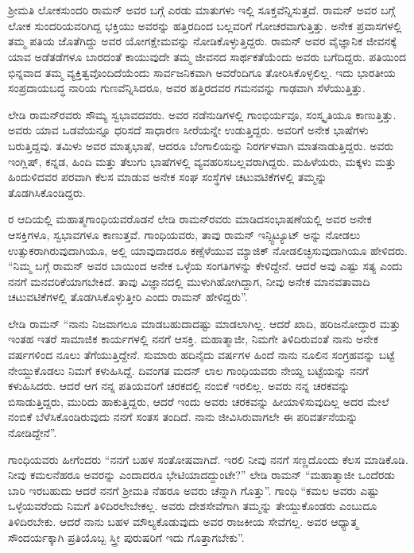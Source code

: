 
\chapter{}
	

ಶ‍್ರೀಮತಿ ಲೋಕಸುಂದರಿ ರಾಮನ್ ಅವರ ಬಗ್ಗೆ ಎರಡು ಮಾತುಗಳು ಇಲ್ಲಿ ಸೂಕ್ತವೆನ್ನಿಸುತ್ತದೆ. ರಾಮನ್ ಅವರ ಬಗ್ಗೆ ಲೋಕ ಸುಂದರಿಯವರಿಗಿದ್ದ ಭಕ್ತಿಯು ಅವರನ್ನು ಹತ್ತಿರದಿಂದ ಬಲ್ಲವರಿಗೆ ಗೋಚರವಾಗುತ್ತಿತ್ತು. ಅನೇಕ ಪ್ರವಾಸಗಳಲ್ಲಿ ತಮ್ಮ ಪತಿಯ ಜೊತೆಗಿದ್ದು ಅವರ ಯೋಗಕ್ಷೇಮವನ್ನು ನೋಡಿಕೊಳ್ಳುತ್ತಿದ್ದರು. ರಾಮನ್ ಅವರ ವೈಜ್ಞಾನಿಕ ಜೀವನಕ್ಕೆ ಯಾವ ಅಡೆತಡೆಗಳೂ ಬಾರದಂತೆ ಕಾಯುವುದೇ ತಮ್ಮ ಜೀವನದ ಸಾರ್ಥಕತೆಯೆಂದು ಅವರು ಬಗೆದಿದ್ದರು. ಪತಿಯಿಂದ ಭಿನ್ನವಾದ ತಮ್ಮ ವ್ಯಕ್ತಿತ್ವವೊಂದಿದೆಯೆಂದು ಸಾರ್ವಜನಿಕವಾಗಿ ಅವರೆಂದಿಗೂ ತೋರಿಸಿಕೊಳ್ಳಲಿಲ್ಲ. ಇದು ಭಾರತೀಯ ಸಂಪ್ರದಾಯಬದ್ಧ ನಾರಿಯ ಗುಣವೆನ್ನಿಸಿದರೂ, ಅವರ ಹತ್ತಿರದವರ ಗಮನವನ್ನು ಗಾಢವಾಗಿ ಸೆಳೆಯುತ್ತಿತ್ತು.

ಲೇಡಿ ರಾಮನ್‍ರವರು ಸೌಮ್ಯ ಸ್ವಭಾವದವರು. ಅವರ ನಡೆನುಡಿಗಳಲ್ಲಿ ಗಾಂಭಿರ್ಯವೂ, ಸಂಸ್ಕೃತಿಯೂ ಕಾಣುತ್ತಿತ್ತು. ಅವರು ಯಾವ ಒಡವೆಯನ್ನೂ ಧರಿಸದೆ ಸಾಧಾರಣ ಸೀರೆಯನ್ನೇ ಉಡುತ್ತಿದ್ದರು. ಅವರಿಗೆ ಅನೇಕ ಭಾಷೆಗಳು ಬರುತ್ತಿದ್ದವು. ತಮಿಳು ಅವರ ಮಾತೃಭಾಷೆ, ಆದರೂ ಬೆಂಗಾಲಿಯನ್ನು ನಿರರ್ಗಳವಾಗಿ ಮಾತನಾಡುತ್ತಿದ್ದರು. ಅವರು ಇಂಗ್ಲಿಷ್, ಕನ್ನಡ, ಹಿಂದಿ ಮತ್ತು ತೆಲುಗು ಭಾಷೆಗಳಲ್ಲಿ ವ್ಯವಹರಿಸಬಲ್ಲವರಾಗಿದ್ದರು. ಮಹಿಳೆಯರು, ಮಕ್ಕಳು ಮತ್ತು ಹಿಂದುಳಿದವರ ಪರವಾಗಿ ಕೆಲಸ ಮಾಡುವ ಅನೇಕ ಸಂಘ ಸಂಸ್ಥೆಗಳ ಚಟುವಟಿಕೆಗಳಲ್ಲಿ ತಮ್ಮನ್ನು ತೊಡಗಿಸಿಕೊಂಡಿದ್ದರು.

ರ ಆದಿಯಲ್ಲಿ ಮಹಾತ್ಮಗಾಂಧಿಯವರೊಡನೆ ಲೇಡಿ ರಾಮನ್‍ರವರು ಮಾಡಿದ\break ಸಂಭಾಷಣೆಯಲ್ಲಿ ಅವರ ಅನೇಕ ಆಸಕ್ತಿಗಳೂ, ಸ್ವಭಾವಗಳೂ ಕಾಣುತ್ತವೆ. ಗಾಂಧಿಯವರು, ತಾವು ರಾಮನ್ ಇನ್ಸ್ಟಿಟ್ಯೂಟ್ ಅನ್ನು ನೋಡಲು ಉತ್ಸುಕರಾಗಿರುವುದಾಗಿಯೂ, ಅಲ್ಲಿ ಯಾವುದಾದರೂ ಕಣ್ಸೆಳೆಯುವ ಮ್ಯಾಜಿಕ್ ನೋಡಲಿಚ್ಛಿಸುವುದಾಗಿಯೂ ಹೇಳಿದರು. “ನಿಮ್ಮ ಬಗ್ಗೆ ರಾಮನ್ ಅವರ ಬಾಯಿಂದ ಅನೇಕ ಒಳ್ಳೆಯ ಸಂಗತಿಗಳನ್ನು ಕೇಳಿದ್ದೇನೆ. ಆದರೆ ಅವು ಎಷ್ಟು ಸತ್ಯ ಎಂದು ನನಗೆ ಮನವರಿಕೆಯಾಗಬೇಕಿದೆ. ತಾವು ವಿಜ್ಞಾನದಲ್ಲಿ ಮುಳುಗಿಹೋಗಿದ್ದಾಗ, ನೀವು ಅನೇಕ ಮಾನವತಾವಾದಿ ಚಟುವಟಿಕೆಗಳಲ್ಲಿ ತೊಡಗಿಸಿಕೊಳ್ಳುತ್ತೀರಿ ಎಂದು ರಾಮನ್ ಹೇಳಿದ್ದರು”.

ಲೇಡಿ ರಾಮನ್ \enginline{--} “ನಾನು ನಿಜವಾಗಲೂ ಮಾಡಬಹುದಾದಷ್ಟು ಮಾಡಲಾಗಿಲ್ಲ. ಆದರೆ ಖಾದಿ, ಹರಿಜನೋದ್ಧಾರ ಮತ್ತು ಇಂತಹ ಇತರೆ ಸಾಮಾಜಿಕ ಕಾರ್ಯಗಳಲ್ಲಿ ನನಗೆ ಆಸಕ್ತಿ. ಮಹಾತ್ಮಾಜೀ, ನಿಮಗೇ ತಿಳಿದಿರುವಂತೆ ನಾನು ಅನೇಕ ವರ್ಷಗಳಿಂದ ನೂಲು ತೆಗೆಯುತ್ತಿದ್ದೇನೆ. ಸುಮಾರು ಹದಿನೈದು ವರ್ಷಗಳ ಹಿಂದೆ ನಾನು ನೂಲಿನ ಸಂಗ್ರಹವನ್ನು ಬಟ್ಟೆ ನೇಯ್ದುಕೊಡಲು ನಿಮಗೆ ಕಳುಹಿಸಿದ್ದೆ. ದಿವಂಗತ ಮದನ್ ಲಾಲ ಗಾಂಧಿಯವರು ನೇಯ್ದ ಬಟ್ಟೆಯನ್ನು ನನಗೆ ಕಳುಹಿಸಿದರು. ಆದರೆ ಆಗ ನನ್ನ ಪತಿಯವರಿಗೆ ಚರಕದಲ್ಲಿ ನಂಬಿಕೆ ಇರಲಿಲ್ಲ. ಅವರು ನನ್ನ ಚರಕವನ್ನು ಬಿಸಾಡುತ್ತಿದ್ದರು, ಮುರಿದು ಹಾಕುತ್ತಿದ್ದರು, ಆದರೆ ಇಂದು ಅವರು ಚರಕವನ್ನು ಹೀಯಾಳಿಸುವುದಿಲ್ಲ ಅದರ ಮೇಲೆ ನಂಬಿಕೆ ಬೆಳೆಸಿಕೊಂಡಿರುವುದು ನನಗೆ ಸಂತಸ ತಂದಿದೆ. ನಾನು ಜೀವಿಸಿರುವಾಗಲೇ ಈ ಪರಿವರ್ತನೆಯನ್ನು ನೋಡಿದ್ದೇನೆ”.

ಗಾಂಧಿಯವರು ಹೀಗೆಂದರು “ನನಗೆ ಬಹಳ ಸಂತೋಷವಾಗಿದೆ. ಇರಲಿ ನೀವು ನನಗೆ ಸಣ್ಣದೊಂದು ಕೆಲಸ ಮಾಡಿಕೊಡಿ. ನೀವು ಕಮಲನೆಹರೂ ಅವರನ್ನು ಎಂದಾದರೂ ಭೇಟಿಯಾದ\-ದ್ದುಂಟೇ?” ಲೇಡಿ ರಾಮನ್\enginline{--} “ಮಹಾತ್ಮಾಜೀ ಒಂದೆರಡು ಬಾರಿ ಇರಬಹುದು ಆದರೆ ನನಗೆ ಶ‍್ರೀಮತಿ ನೆಹರೂ ಅವರು ಚೆನ್ನಾಗಿ ಗೊತ್ತು”. ಗಾಂಧಿ \enginline{--} “ಕಮಲ ಅವರು ಎಷ್ಟು ಒಳ್ಳೆಯವರೆಂದು ನಿಮಗೆ ತಿಳಿದಿರಲೇಬೇಕಲ್ಲ. ಅವರು ದೇಶಸೇವೆಗಾಗಿ ತಮ್ಮನ್ನು ತೇಯ್ದುಕೊಂಡರು ಎಂಬುದೂ ತಿಳಿದಿರಬೇಕು. ಆದರೆ ನಾನು ಬಹಳ ಮೌಲ್ಯಕೊಡುವುದು ಅವರ ರಾಜಕೀಯ ಸೇವೆಗಲ್ಲ. ಅವರ ಆಧ್ಯಾತ್ಮ ಸೌಂದರ್ಯಕ್ಕಾಗಿ ಪ್ರತಿಯೊಬ್ಬ ಸ್ತ್ರೀ ಪುರುಷರಿಗೆ ಇದು ಗೊತ್ತಾಗಬೇಕು”.

